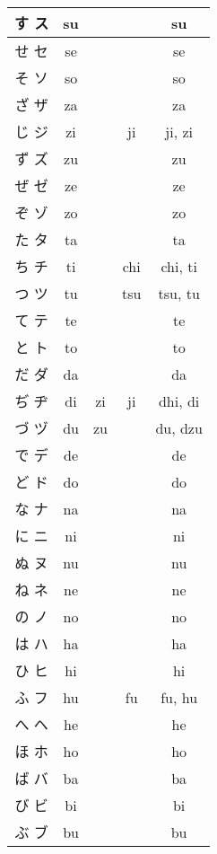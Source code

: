 \documentclass{article}
\begin{document}
\begin{center}
\begin{japanese}
\begin{longtable}{|c|c c c|c|}
                す ス & su &&& su \\ \hline
                せ セ & se &&& se \\ \hline
                そ ソ & so &&& so \\ \hline
                ざ ザ & za &&& za \\ \hline
                じ ジ & zi && ji & ji, zi \\ \hline
                ず ズ & zu &&& zu \\ \hline
                ぜ ゼ & ze &&& ze \\ \hline
                ぞ ゾ & zo &&& zo \\ \hline
                た タ & ta &&& ta \\ \hline
                ち チ & ti && chi & chi, ti \\ \hline
                つ ツ & tu && tsu & tsu, tu \\ \hline
                て テ & te &&& te \\ \hline
                と ト & to &&& to \\ \hline
                だ ダ & da &&& da \\ \hline
                ぢ ヂ & di & zi & ji & dhi, di \\ \hline
                づ ヅ & du & zu && du, dzu \\ \hline
                で デ & de &&& de \\ \hline
                ど ド & do &&& do \\ \hline
                な ナ & na &&& na \\ \hline
                に ニ & ni &&& ni \\ \hline
                ぬ ヌ & nu &&& nu \\ \hline
                ね ネ & ne &&& ne \\ \hline
                の ノ & no &&& no \\ \hline
                は ハ & ha &&& ha \\ \hline
                ひ ヒ & hi &&& hi \\ \hline
                ふ フ & hu && fu & fu, hu \\ \hline
                へ ヘ & he &&& he \\ \hline
                ほ ホ & ho &&& ho \\ \hline
                ば バ & ba &&& ba \\ \hline
                び ビ & bi &&& bi \\ \hline
                ぶ ブ & bu &&& bu \\ \hline

\end{longtable}
\end{japanese}
\end{center}
\end{document}
